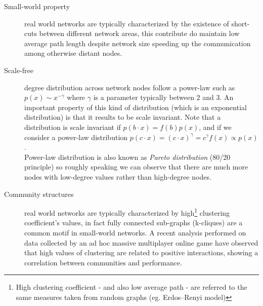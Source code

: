 \begin{description}

\item[Small-world property] real world networks are typically characterized by the existence of short-cuts between different network areas, this contribute do maintain low average path length despite network size\cite{citeulike:481248} speeding up the communication among otherwise distant nodes.

\item[Scale-free] degree distribution across network nodes follow a power-law such as $p(x) \sim x^{-\gamma}$ where $\gamma$ is a parameter typically between 2 and 3. An important property of this kind of distribution (which is an exponential distribution) is that it results to be scale invariant. Note that a distribution is scale invariant if $p(b \cdot x) = f(b) p(x)$, and if we consider a power-law distribution $p(c \cdot x) = (c \cdot x)^\gamma = c^\gamma f(x) \propto p(x)$.\\ 
Power-law distribution is also known as \emph{Pareto distribution} (80/20 principle) so roughly speaking we can observe that there are much more nodes with low-degree values rather than high-degree nodes.

\item[Community structures] real world networks are typically characterized by high\footnote{High clustering coefficient - and also low average path - are referred to the same measures taken from random graphs (eg. Erdos–Renyi model) } clustering coefficient's values, in fact fully connected sub-graphs (k-cliques) are a common motif in small-world networks\cite{citeulike:481248}. A recent analysis performed on data collected by an ad hoc massive multiplayer online game\cite{citeulike:6926207} have observed that high values of clustering are related to positive interactions, showing a correlation between communities and performance.

\end{description}

